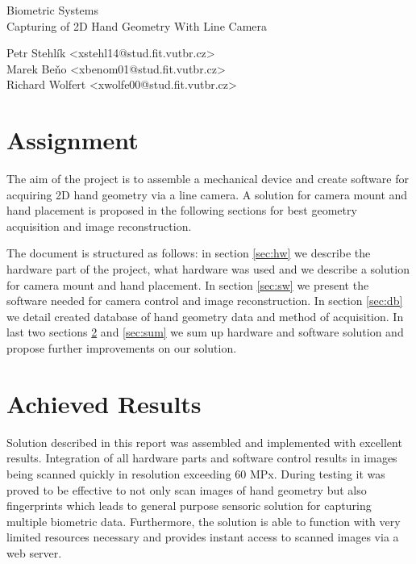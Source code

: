 \documentclass[11pt,a4paper]{article}
\begin{document}
\begin{center}
	\LARGE{Biometric Systems}\\
	\Large{Capturing of 2D Hand Geometry With Line Camera}
	\vspace{0.5cm}

    \begin{centering}
    \small{
        Petr Stehlík <xstehl14@stud.fit.vutbr.cz>\\
        Marek Beňo <xbenom01@stud.fit.vutbr.cz>\\
        Richard Wolfert <xwolfe00@stud.fit.vutbr.cz>\\
        }
    \end{centering}

	\vspace{0.2cm}

\end{center}

\section{Assignment}
The aim of the project is to assemble a mechanical device and create software for acquiring 2D hand geometry via a line camera.
A solution for camera mount and hand placement is proposed in the following sections for best geometry acquisition and image reconstruction.

The document is structured as follows: in section \ref{sec:hw} we describe the hardware part of the project, what hardware was used
and we describe a solution for camera mount and hand placement. In section \ref{sec:sw} we present the software needed for camera control and image reconstruction.
In section \ref{sec:db} we detail created database of hand geometry data and method of acquisition. In last two sections \ref{sec:res}
and \ref{sec:sum} we sum up hardware and software solution and propose further improvements on our solution.








\section{Achieved Results}
\label{sec:res}
Solution described in this report was assembled and implemented with excellent results. Integration of all hardware parts and software control results
in images being scanned quickly in resolution exceeding 60 MPx. During testing it was proved to be effective to not only scan images
of hand geometry but also fingerprints which leads to general purpose sensoric solution for capturing multiple biometric data. Furthermore,
the solution is able to function with very limited resources necessary and provides instant access to scanned images via a web server.
\end{document}
